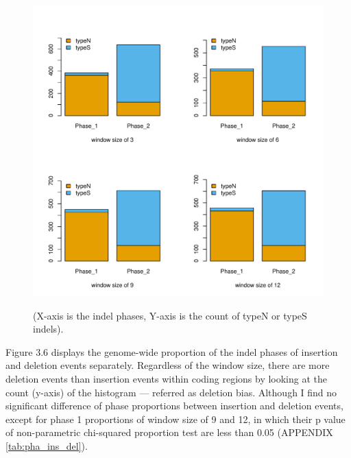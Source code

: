 \begin{figure}[H]
     \centering
     \begin{minipage}[t]{1\textwidth }
     \includegraphics[width=\linewidth, height=\linewidth]{Fig5.pdf}
     { {(X-axis is the indel phases, Y-axis is the count of typeN or typeS indels).}\par}
     \end{minipage}
\end{figure}
  
Figure 3.6 displays the genome-wide proportion of the indel phases of insertion and deletion events separately. Regardless of the window size, there are more deletion events than insertion events within coding regions by looking at the count (y-axis) of the histogram --- referred as deletion bias. Although I find no significant difference of phase proportions between insertion and deletion events, except for phase 1 proportions of window size of 9 and 12, in which their p value of non-parametric chi-squared proportion test are less than 0.05 (APPENDIX \ref{tab:pha_ins_del}). 

